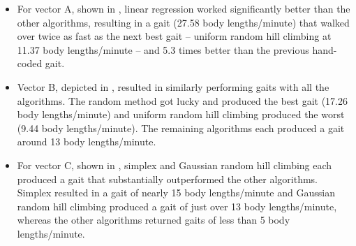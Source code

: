\begin{itemize}

\item For vector A, shown in , linear regression
  worked significantly better than the other algorithms, resulting in
  a gait (27.58 body lengths/minute) that walked over twice as fast as
  the next best gait -- uniform random hill climbing at 11.37 body
  lengths/minute -- and 5.3 times better than the previous hand-coded
  gait.

\item Vector B, depicted in , resulted in similarly
  performing gaits with all the algorithms. The random method got
  lucky and produced the best gait (17.26 body lengths/minute) and
  uniform random hill climbing produced the worst (9.44 body
  lengths/minute). The remaining algorithms each produced a gait
  around 13 body lengths/minute.

\item For vector C, shown in , simplex and Gaussian
  random hill climbing each produced a gait that substantially
  outperformed the other algorithms. Simplex resulted in a gait of
  nearly 15 body lengths/minute and Gaussian random hill climbing
  produced a gait of just over 13 body lengths/minute, whereas the
  other algorithms returned gaits of less than 5 body lengths/minute.

\end{itemize}




